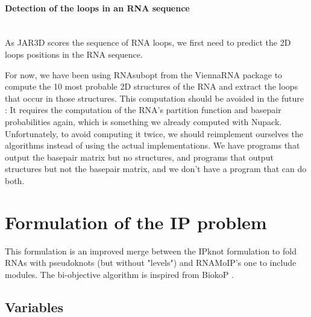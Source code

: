 \documentclass{article}
\begin{document}
\paragraph{\textbf{Detection of the loops in an RNA sequence}} ~ \\
As JAR3D scores the sequence of RNA loops, we first need to predict the 2D loops positions in the RNA sequence.

For now, we have been using RNAsubopt from the ViennaRNA package \cite{lorenz_viennarna_2011} to compute the 10 most probable 2D structures of the RNA and extract the loops that occur in those structures.
This computation should be avoided in the future : It requires the computation of the RNA's partition function and basepair probabilities again, which is something we already computed with Nupack.
Unfortunately, to avoid computing it twice, we should reimplement ourselves the algorithms instead of using the actual implementations. We have programs that output the basepair matrix but no structures, and programs that output structures but not the basepair matrix, and we don't have a program that can do both.

\section{Formulation of the IP problem}
	
This formulation is an improved merge between the IPknot \cite{sato_ipknot:_2011} formulation to fold RNAs with pseudoknots (but without "levels") and RNAMoIP's one \cite{reinharz_towards_2012} to include modules. The bi-objective algorithm is inspired from BiokoP \cite{legendre_bi-objective_2018}.
	
	
\subsection{Variables} 
	
\end{document}
